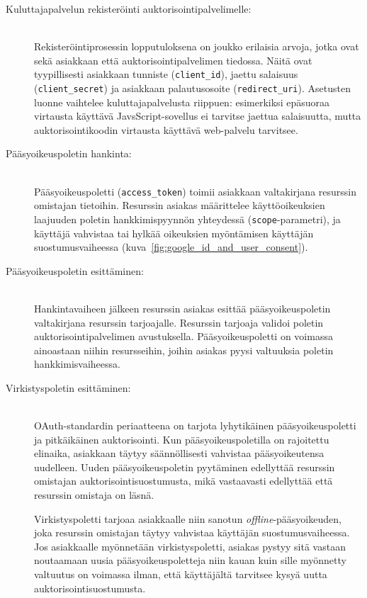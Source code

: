 \documentclass[finnish,gradu]{tktltiki}
\begin{document}
  \begin{description}
  \item[Kuluttajapalvelun rekisteröinti auktorisointipalvelimelle:] \hfill \\
   Rekisteröintiprosessin lopputuloksena on joukko erilaisia arvoja, jotka ovat sekä asiakkaan että auktorisointipalvelimen tiedossa. Näitä ovat tyypillisesti asiakkaan tunniste (\verb!client_id!), jaettu salaisuus (\verb!client_secret!) ja asiakkaan palautusosoite (\verb!redirect_uri!). Asetusten luonne vaihtelee kuluttajapalvelusta riippuen: esimerkiksi epäsuoraa virtausta käyttävä JavsScript-sovellus ei tarvitse jaettua salaisuutta, mutta auktorisointikoodin virtausta käyttävä web-palvelu tarvitsee.

  \item[Pääsyoikeuspoletin hankinta:] \hfill \\
  Pääsyoikeuspoletti (\verb!access_token!) toimii asiakkaan valtakirjana resurssin omistajan tietoihin. Resurssin asiakas määrittelee käyttöoikeuksien laajuuden poletin hankkimispyynnön yhteydessä (\verb!scope!-parametri), ja käyttäjä vahvistaa tai hylkää oikeuksien myöntämisen käyttäjän suostumusvaiheessa (kuva~\ref{fig:google_id_and_user_consent}).

  \item[Pääsyoikeuspoletin esittäminen:] \hfill \\
  Hankintavaiheen jälkeen resurssin asiakas esittää pääsyoikeuspoletin valtakirjana resurssin tarjoajalle. Resurssin tarjoaja validoi poletin auktorisointipalvelimen avustuksella. Pääsyoikeuspoletti on voimassa ainoastaan niihin resursseihin, joihin asiakas pyysi valtuuksia poletin hankkimisvaiheessa.

  \item[Virkistyspoletin esittäminen:] \hfill \\
  OAuth-standardin periaatteena on tarjota lyhytikäinen pääsyoikeuspoletti ja pitkäikäinen auktorisointi. Kun pääsyoikeuspoletilla on rajoitettu elinaika, asiakkaan täytyy säännöllisesti vahvistaa pääsyoikeutensa uudelleen. Uuden pääsyoikeuspoletin pyytäminen edellyttää resurssin omistajan auktorisointisuostumusta, mikä vastaavasti edellyttää että resurssin omistaja on läsnä.

  Virkistyspoletti tarjoaa asiakkaalle niin sanotun \emph{offline}-pääsyoikeuden, joka resurssin omistajan täytyy vahvistaa käyttäjän suostumusvaiheessa. Jos asiakkaalle myönnetään virkistyspoletti, asiakas pystyy sitä vastaan noutaamaan uusia pääsyoikeuspoletteja niin kauan kuin sille myönnetty valtuutus on voimassa ilman, että käyttäjältä tarvitsee kysyä uutta auktorisointisuostumusta.

  \end{description}
\end{document}

